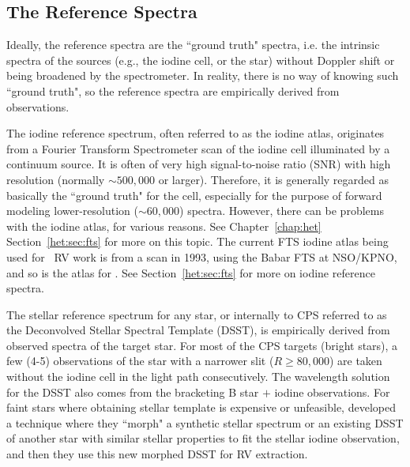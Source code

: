 \subsection{The Reference Spectra}\label{doppler:sec:reference}

Ideally, the reference spectra are the ``ground truth" spectra,
i.e. the intrinsic spectra of the sources (e.g., the iodine cell, or
the star) without Doppler shift or being broadened by the
spectrometer. In reality, there is no way of knowing such ``ground
truth", so the reference spectra are empirically derived from
observations.

The iodine reference spectrum, often referred to as the iodine atlas,
originates from a Fourier Transform Spectrometer scan of the iodine
cell illuminated by a continuum source. It is often of very high
signal-to-noise ratio (SNR) with high resolution (normally $\sim
500,000$ or larger). Therefore, it is generally regarded as basically
the ``ground truth" for the cell, especially for the purpose of
forward modeling lower-resolution ($\sim 60,000$) spectra. However,
there can be problems with the iodine atlas, for various reasons. See
Chapter~\ref{chap:het} Section~\ref{het:sec:fts} for more on this
topic. The current FTS iodine atlas being used for \keck\ RV work is
from a scan in 1993, using the Babar FTS at NSO/KPNO, and so is the
atlas for \het. See Section~\ref{het:sec:fts} for more on iodine
reference spectra.

The stellar reference spectrum for any star, or
internally to CPS referred to as the Deconvolved Stellar Spectral
Template (DSST), is empirically derived from observed spectra of the
target star. For most of the CPS targets (bright stars), a few (4-5)
observations of the star with a narrower slit ($R \geq 80,000$) are
taken without the iodine cell in the light path consecutively.  The wavelength
solution for the DSST also comes from the bracketing B star $+$ iodine
observations. For faint stars where obtaining stellar template is
expensive or unfeasible, \cite{2006ApJ...647..600J} developed a
technique where they ``morph" a synthetic stellar spectrum or an
existing DSST of another star with similar stellar properties to fit
the stellar iodine observation, and then they use this new morphed
DSST for RV extraction.


